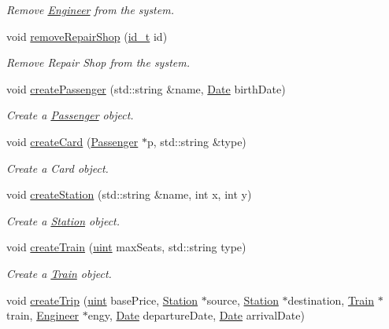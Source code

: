 \begin{DoxyCompactItemize}
\begin{DoxyCompactList}\small\item\em Remove \mbox{\hyperlink{classEngineer}{Engineer}} from the system. \end{DoxyCompactList}\item 
void \mbox{\hyperlink{classSystem_aaf63fe98c16bc79b2e91c3555afd9446}{remove\+Repair\+Shop}} (\mbox{\hyperlink{project__utils_8h_a8f3a969054ad2200720b96e7e23dd4e1}{id\+\_\+t}} id)
\begin{DoxyCompactList}\small\item\em Remove Repair Shop from the system. \end{DoxyCompactList}\item 
void \mbox{\hyperlink{classSystem_a635ad100d71c3d964047376505d7850b}{create\+Passenger}} (std\+::string \&name, \mbox{\hyperlink{classDate}{Date}} birth\+Date)
\begin{DoxyCompactList}\small\item\em Create a \mbox{\hyperlink{classPassenger}{Passenger}} object. \end{DoxyCompactList}\item 
void \mbox{\hyperlink{classSystem_a22dc3f27200865820d450576e129a3f9}{create\+Card}} (\mbox{\hyperlink{classPassenger}{Passenger}} $\ast$p, std\+::string \&type)
\begin{DoxyCompactList}\small\item\em Create a Card object. \end{DoxyCompactList}\item 
void \mbox{\hyperlink{classSystem_aeb522e2930e953770f3c4f52090a8297}{create\+Station}} (std\+::string \&name, int x, int y)
\begin{DoxyCompactList}\small\item\em Create a \mbox{\hyperlink{classStation}{Station}} object. \end{DoxyCompactList}\item 
void \mbox{\hyperlink{classSystem_a0eb9c67e05902a014cf37e8ce1ad2ee3}{create\+Train}} (\mbox{\hyperlink{project__utils_8h_a91ad9478d81a7aaf2593e8d9c3d06a14}{uint}} max\+Seats, std\+::string type)
\begin{DoxyCompactList}\small\item\em Create a \mbox{\hyperlink{classTrain}{Train}} object. \end{DoxyCompactList}\item 
void \mbox{\hyperlink{classSystem_a6ce652f45a3883db7b3cce145b25585c}{create\+Trip}} (\mbox{\hyperlink{project__utils_8h_a91ad9478d81a7aaf2593e8d9c3d06a14}{uint}} base\+Price, \mbox{\hyperlink{classStation}{Station}} $\ast$source, \mbox{\hyperlink{classStation}{Station}} $\ast$destination, \mbox{\hyperlink{classTrain}{Train}} $\ast$train, \mbox{\hyperlink{classEngineer}{Engineer}} $\ast$engy, \mbox{\hyperlink{classDate}{Date}} departure\+Date, \mbox{\hyperlink{classDate}{Date}} arrival\+Date)

\end{DoxyCompactItemize}
